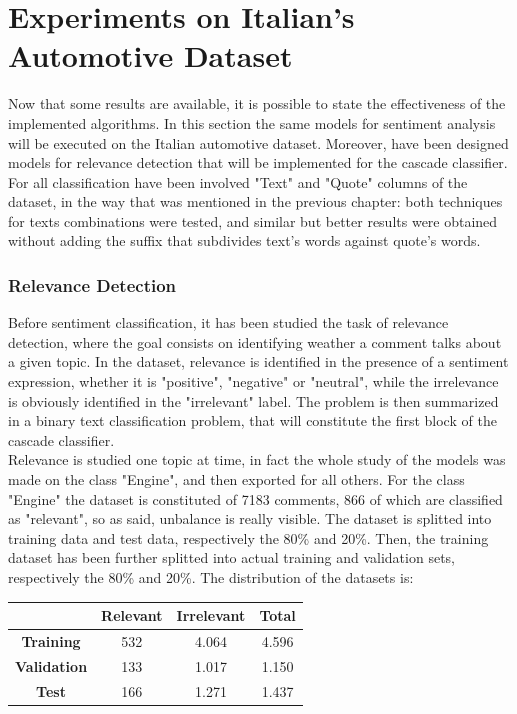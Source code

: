 \section{Experiments on Italian's Automotive Dataset}

Now that some results are available, it is possible to state the effectiveness of the implemented algorithms. In this section the same models for sentiment analysis will be executed on the Italian automotive dataset. Moreover, have been designed models for relevance detection that will be implemented for the cascade classifier. For all classification have been involved "Text" and "Quote" columns of the dataset, in the way that was mentioned in the previous chapter: both techniques for texts combinations were tested, and similar but better results were obtained without adding the suffix that subdivides text's words against quote's words. \\

\subsubsection{Relevance Detection}

Before sentiment classification, it has been studied the task of relevance detection, where the goal consists on identifying weather a comment talks about a given topic. In the dataset, relevance is identified in the presence of a sentiment expression, whether it is "positive", "negative" or "neutral", while the irrelevance is obviously identified in the "irrelevant" label. The problem is then summarized in a binary text classification problem, that will constitute the first block of the cascade classifier.\\
Relevance is studied one topic at time, in fact the whole study of the models was made on the class "Engine", and then exported for all others. For the class "Engine" the dataset is constituted of 7183 comments, 866 of which are classified as "relevant", so as said, unbalance is really visible. The dataset is splitted into training data and test data, respectively the 80\% and 20\%. Then, the training dataset has been further splitted into actual training and validation sets, respectively the 80\% and 20\%. The distribution of the datasets is:

\begin{center}
	\begin{tabular}{ | c  c  c | c | } 
		\hline
		& \textbf{Relevant} & \textbf{Irrelevant} & \textbf{Total} \\
		\hline
		\textbf{Training} & 532 & 4.064 & 4.596 \\ 
		\hline
		\textbf{Validation} & 133 & 1.017 & 1.150 \\ 
		\hline
		\textbf{Test} & 166 & 1.271 & 1.437\\
		\hline
	\end{tabular}
\end{center}

